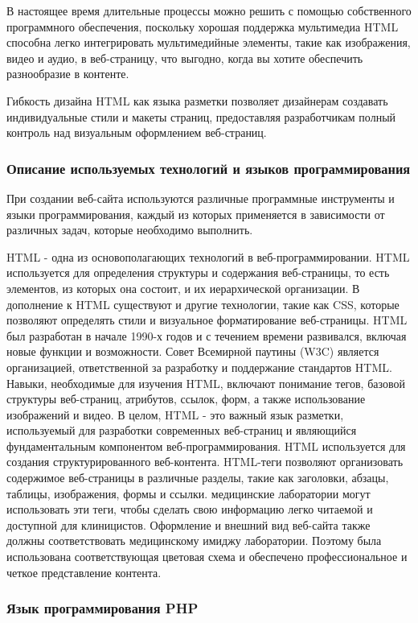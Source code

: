 В настоящее время длительные процессы можно решить с помощью собственного программного обеспечения, поскольку хорошая поддержка мультимедиа HTML способна легко интегрировать мультимедийные элементы, такие как изображения, видео и аудио, в веб-страницу, что выгодно, когда вы хотите обеспечить разнообразие в контенте.

Гибкость дизайна HTML как языка разметки позволяет дизайнерам создавать индивидуальные стили и макеты страниц, предоставляя разработчикам полный контроль над визуальным оформлением веб-страниц.

\subsubsection{Описание используемых технологий и языков программирования}

При создании веб-сайта используются различные программные инструменты и языки программирования, каждый из которых применяется в зависимости от различных задач, которые необходимо выполнить.

HTML - одна из основополагающих технологий в веб-программировании. HTML используется для определения структуры и содержания веб-страницы, то есть элементов, из которых она состоит, и их иерархической организации.
В дополнение к HTML существуют и другие технологии, такие как CSS, которые позволяют определять стили и визуальное форматирование веб-страницы.
HTML был разработан в начале 1990-х годов и с течением времени развивался, включая новые функции и возможности. Совет Всемирной паутины (W3C) является организацией, ответственной за разработку и поддержание стандартов HTML.
Навыки, необходимые для изучения HTML, включают понимание тегов, базовой структуры веб-страниц, атрибутов, ссылок, форм, а также использование изображений и видео.
В целом, HTML - это важный язык разметки, используемый для разработки современных веб-страниц и являющийся фундаментальным компонентом веб-программирования.
HTML используется для создания структурированного веб-контента. 
HTML-теги позволяют организовать содержимое веб-страницы в различные разделы, такие как заголовки, абзацы, таблицы, изображения, формы и ссылки. медицинские лаборатории могут использовать эти теги, чтобы сделать свою информацию легко читаемой и доступной для клиницистов.
Оформление и внешний вид веб-сайта также должны соответствовать медицинскому имиджу лаборатории. Поэтому была использована соответствующая цветовая схема и обеспечено профессиональное и четкое представление контента.

\subsubsection{Язык программирования PHP}

